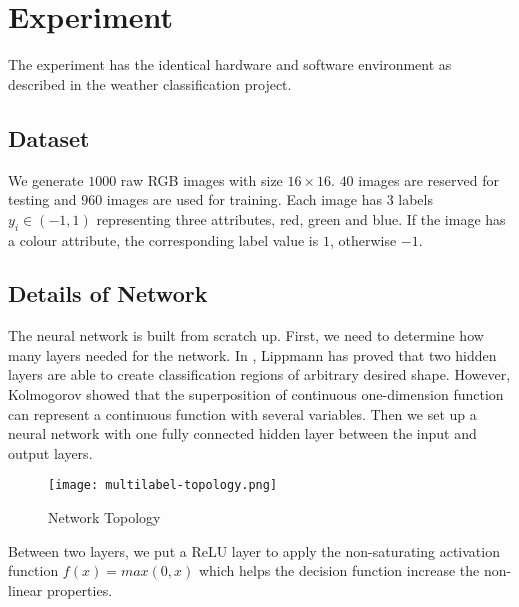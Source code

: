 
\chapter{Experiment} %
\label{Chapter8}

The experiment has the identical hardware and software environment as described in the weather classification project.

\section{Dataset}

We generate $1000$ raw RGB images with size $16 \times 16$. $40$ images are reserved for testing and $960$ images are used for training. Each image has $3$ labels $y_i \in (-1, 1)$ representing three attributes, red, green and blue. If the image has a colour attribute, the corresponding label value is $1$, otherwise $-1$.

\section{Details of Network}

The neural network is built from scratch up. First, we need to determine how many layers needed for the network. In \cite{lippmann1987introduction}, Lippmann has proved that two hidden layers are able to create classification regions of arbitrary desired shape. However, Kolmogorov \citep{kolmogorov1963representation} showed that the superposition of continuous one-dimension function can represent a continuous function with several variables. Then we set up a neural network with one fully connected hidden layer between the input and output layers.
\begin{figure}[!htb]
\centering
\texttt{[image: multilabel-topology.png]}
\caption{\label{fig:MLtopology}Network Topology}
\end{figure}
Between two layers, we put a ReLU layer to apply the non-saturating activation function $f(x) = max(0,x)$ which helps the decision function increase the non-linear properties.

